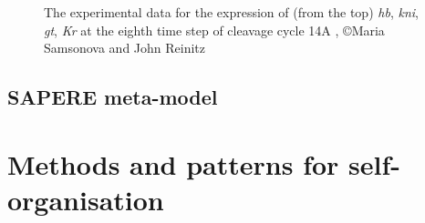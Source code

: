 \documentclass[12pt,a4paper,twoside,openright]{book}
\begin{document}
\begin{figure}
\caption[Drosophila experimental data]{The experimental data for the expression of (from the top) \emph{hb}, \emph{kni}, \emph{gt}, \emph{Kr} at the eighth time step of cleavage cycle 14A  \cite{database-2008}, \copyright Maria Samsonova and John Reinitz}
\label{fig:expdata}
\end{figure}


\section{SAPERE meta-model}

\chapter{Methods and patterns for self-organisation}
\end{document}
